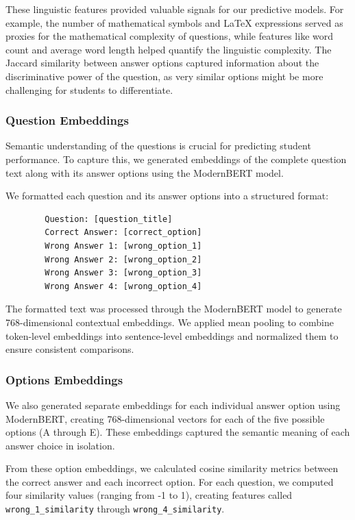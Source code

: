 \documentclass[11pt]{article}
\begin{document}
These linguistic features provided valuable signals for our predictive models. For example, the number of mathematical symbols and LaTeX expressions served as proxies for the mathematical complexity of questions, while features like word count and average word length helped quantify the linguistic complexity. The Jaccard similarity between answer options captured information about the discriminative power of the question, as very similar options might be more challenging for students to differentiate.

\subsubsection{Question Embeddings}

Semantic understanding of the questions is crucial for predicting student performance. To capture this, we generated embeddings of the complete question text along with its answer options using the ModernBERT model.

We formatted each question and its answer options into a structured format:
\begin{verbatim}
        Question: [question_title]
        Correct Answer: [correct_option]
        Wrong Answer 1: [wrong_option_1]
        Wrong Answer 2: [wrong_option_2]
        Wrong Answer 3: [wrong_option_3]
        Wrong Answer 4: [wrong_option_4]
    \end{verbatim} %

The formatted text was processed through the ModernBERT model to generate 768-dimensional contextual embeddings. We applied mean pooling to combine token-level embeddings into sentence-level embeddings and normalized them to ensure consistent comparisons.


\subsubsection{Options Embeddings}

We also generated separate embeddings for each individual answer option using ModernBERT, creating 768-dimensional vectors for each of the five possible options (A through E). These embeddings captured the semantic meaning of each answer choice in isolation.

From these option embeddings, we calculated cosine similarity metrics between the correct answer and each incorrect option. For each question, we computed four similarity values (ranging from -1 to 1), creating features called \texttt{wrong\_1\_similarity} through \texttt{wrong\_4\_similarity}.
\end{document}
